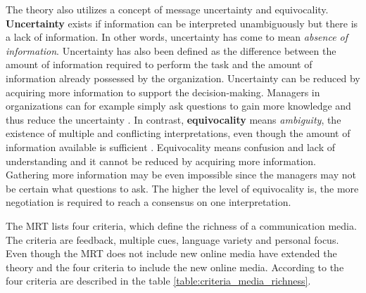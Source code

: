 \documentclass[english,12pt,a4paper,pdftex]{article}
\begin{document}
The theory also utilizes a concept of message uncertainty and equivocality. \textbf{Uncertainty} exists if information can be interpreted unambiguously but there is a lack of information. In other words, uncertainty has come to mean \textit{absence of information}. Uncertainty has also been defined as the difference between the amount of information required to perform the task and the amount of information already possessed by the organization. Uncertainty can be reduced by acquiring more information to support the decision-making. Managers in organizations can for example simply ask questions to gain more knowledge and thus reduce the uncertainty \citep{daft1987}. In contrast, \textbf{equivocality} means \textit{ambiguity}, the existence of multiple and conflicting interpretations, even though the amount of information available is sufficient \citep{daft1987}. Equivocality means confusion and lack of understanding and it cannot be reduced by acquiring more information. Gathering more information may be even impossible since the managers may not be certain what questions to ask. The higher the level of equivocality is, the more negotiation is required to reach a consensus on one interpretation.

The \ac{MRT} lists four criteria, which define the richness of a communication media. The criteria are feedback, multiple cues, language variety and personal focus. Even though the \ac{MRT} does not include new online media \citet{graveline2000} have extended the theory and the four criteria to include the new online media. According to \citet{graveline2000} the four criteria are described in the table \ref{table:criteria_media_richness}.
\end{document}
